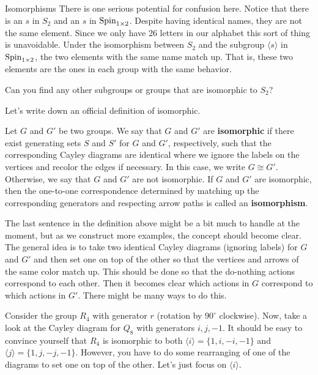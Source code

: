 \begin{section}{Isomorphisms}
There is one serious potential for confusion here.  Notice that there is an $s$ in $S_2$ and an $s$ in $\operatorname{Spin}_{1\times 2}$.  Despite having identical names, they are not the same element.  Since we only have 26 letters in our alphabet this sort of thing is unavoidable.  Under the isomorphism between $S_2$ and the subgroup $\langle s\rangle$ in $\operatorname{Spin}_{1\times 2}$, the two elements with the same name match up.  That is, these two elements are the ones in each group with the same behavior.

\begin{exercise}
Can you find any other subgroups or groups that are isomorphic to $S_2$?
\end{exercise}

Let's write down an official definition of isomorphic.

\begin{definition}
Let $G$ and $G'$ be two groups.  We say that $G$ and $G'$ are \textbf{isomorphic} if there exist generating sets $S$ and $S'$ for $G$ and $G'$, respectively, such that the corresponding Cayley diagrams are identical where we ignore the labels on the vertices and recolor the edges if necessary.  In this case, we write $G\cong G'$.  Otherwise, we say that $G$ and $G'$ are not isomorphic.  If $G$ and $G'$ are isomorphic, then the one-to-one correspondence determined by matching up the corresponding generators and respecting arrow paths is called an \textbf{isomorphism}.
\end{definition}

The last sentence in the definition above might be a bit much to handle at the moment, but as we construct more examples, the concept should become clear.  The general idea is to take two identical Cayley diagrams (ignoring labels) for $G$ and $G'$ and then set one on top of the other so that the vertices and arrows of the same color match up.  This should be done so that the do-nothing actions correspond to each other.  Then it becomes clear which actions in $G$ correspond to which actions in $G'$.  There might be many ways to do this.

Consider the group $R_4$ with generator $r$ (rotation by $90^\circ$ clockwise).  Now, take a look at the Cayley diagram for $Q_8$ with generators $i, j, -1$.  It should be easy to convince yourself that $R_4$ is isomorphic to both $\langle i\rangle=\{1,i,-i,-1\}$ and $\langle j\rangle=\{1,j,-j,-1\}$.  However, you have to do some rearranging of one of the diagrams to set one on top of the other.  Let's just focus on $\langle i\rangle$.  


\end{section}

